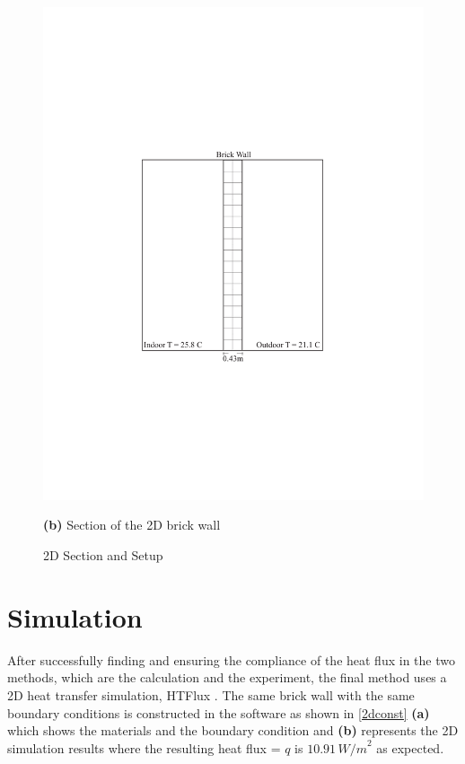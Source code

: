 \begin{figure}[tbh]
\begin{minipage}{0.47\textwidth}
  \includegraphics[trim=5.6cm 7.5cm 5.3cm 8cm, clip, width=.95\linewidth]{Figures/2dsection1.pdf}
  \caption*{\textbf{(b)} Section of the 2D brick wall}
\end{minipage}
\caption{2D Section and Setup}
\label{fig:2d2}
\end{figure}





















\section{Simulation}
After successfully finding and ensuring the compliance of the heat flux in the two methods, which are the calculation and the experiment, the final method uses a 2D heat transfer simulation, HTFlux \cite{HTflux}. The same brick wall with the same boundary conditions is constructed in the software as shown in \ref{2dconst} \textbf{(a)} which shows the materials and the boundary condition and \textbf{(b)} represents the 2D simulation results where the resulting heat flux = \( q \) is \( 10.91 \, {W/m}^2 \) as expected.





